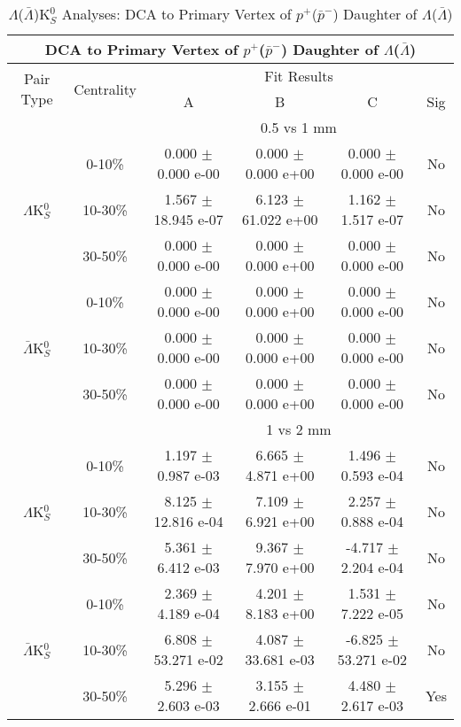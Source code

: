 \documentclass[../AnalysisNoteJBuxton.tex]{subfiles}
\begin{document}
\begin{table}
 \centering
 \begin{tabular}{|c|c|c|c|c|c|}
  \multicolumn{6}{c}{DCA to Primary Vertex of $p^{+}$($\bar{p}^{-}$) Daughter of $\Lambda$($\bar{\Lambda}$)} \\
  \hline
  \multirow{2}{*}{Pair Type} & \multirow{2}{*}{Centrality} & \multicolumn{4}{c|}{Fit Results} \\
  \cline{3-6}
   & & A & B & C & Sig \\  
  \hline
  \multicolumn{2}{|c}{} & \multicolumn{4}{c|}{0.5 vs 1 mm} \\  
  \hline  
  \multirow{3}{*}{$\Lambda$K$^{0}_{S}$}
   &  0-10\% & 0.000 $\pm$ 0.000 e-00 & 0.000 $\pm$ 0.000 e+00 & 0.000 $\pm$ 0.000 e-00 & No \\
   & 10-30\% & 1.567 $\pm$ 18.945 e-07 & 6.123 $\pm$ 61.022 e+00 & 1.162 $\pm$ 1.517 e-07 & No \\
   & 30-50\% & 0.000 $\pm$ 0.000 e-00 & 0.000 $\pm$ 0.000 e+00 & 0.000 $\pm$ 0.000 e-00 & No \\
  \hline
  \multirow{3}{*}{$\bar{\Lambda}$K$^{0}_{S}$}  
   &  0-10\% & 0.000 $\pm$ 0.000 e-00 & 0.000 $\pm$ 0.000 e+00 & 0.000 $\pm$ 0.000 e-00 & No \\
   & 10-30\% & 0.000 $\pm$ 0.000 e-00 & 0.000 $\pm$ 0.000 e+00 & 0.000 $\pm$ 0.000 e-00 & No \\
   & 30-50\% & 0.000 $\pm$ 0.000 e-00 & 0.000 $\pm$ 0.000 e+00 & 0.000 $\pm$ 0.000 e-00 & No \\
  \hline 
  \multicolumn{2}{|c}{} & \multicolumn{4}{c|}{1 vs 2 mm} \\
  \hline  
  \multirow{3}{*}{$\Lambda$K$^{0}_{S}$}   
   &  0-10\% & 1.197 $\pm$ 0.987 e-03 & 6.665 $\pm$ 4.871 e+00 & 1.496 $\pm$ 0.593 e-04 & No \\
   & 10-30\% & 8.125 $\pm$ 12.816 e-04 & 7.109 $\pm$ 6.921 e+00 & 2.257 $\pm$ 0.888 e-04 & No \\
   & 30-50\% & 5.361 $\pm$ 6.412 e-03 & 9.367 $\pm$ 7.970 e+00 & -4.717 $\pm$ 2.204 e-04 & No \\
  \hline  
  \multirow{3}{*}{$\bar{\Lambda}$K$^{0}_{S}$}
   &  0-10\% & 2.369 $\pm$ 4.189 e-04 & 4.201 $\pm$ 8.183 e+00 & 1.531 $\pm$ 7.222 e-05 & No \\
   & 10-30\% & 6.808 $\pm$ 53.271 e-02 & 4.087 $\pm$ 33.681 e-03 & -6.825 $\pm$ 53.271 e-02 & No \\
   & 30-50\% & 5.296 $\pm$ 2.603 e-03 & 3.155 $\pm$ 2.666 e-01 & 4.480 $\pm$ 2.617 e-03 & Yes \\
  \hline
 \end{tabular}
 \caption{$\Lambda$($\bar{\Lambda}$)K$^{0}_{S}$ Analyses: DCA to Primary Vertex of $p^{+}$($\bar{p}^{-}$) Daughter of $\Lambda$($\bar{\Lambda}$)}
 \label{tab:DcaToPrimVertexProtonDaughtOfLamLamK0Full}
\end{table}
\end{document}
